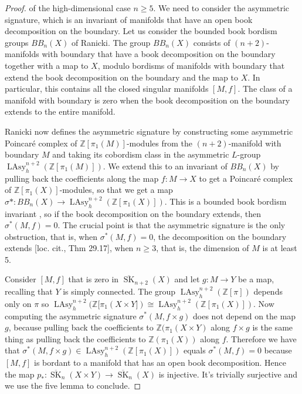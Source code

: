 \documentclass{amsart}
\theoremstyle{definition}
\theoremstyle{remark}
\newcommand{\Z}{\mathbb{Z}}
\newcommand{\SK}{\operatorname{SK}}
\newcommand{\bSK}{\overline{\SK}}
\begin{document}
\begin{proof}
    of the high-dimensional case $n\geq 5$. We need to consider the asymmetric signature, which is an invariant of manifolds that have an open book decomposition on the boundary. Let us consider the bounded book bordism groups $BB_n(X)$ of Ranicki. The group $BB_n(X)$ consists of $(n+2)$-manifolds with boundary that have a book decomposition on the boundary together with a map to $X$, modulo bordisms of manifolds with boundary that extend the book decomposition on the boundary and the map to $X$. In particular, this contains all the closed singular manifolds $[M,f]$. The class of a manifold with boundary is zero when the book decomposition on the boundary extends to the entire manifold. 

    Ranicki now defines the asymmetric signature by constructing some asymmetric Poincar\'e complex of $\Z[\pi_1(M)]$-modules from the $(n+2)$-manifold with boundary $M$ and taking its cobordism class in the asymmetric $L$-group $\operatorname{LAsy}_h^{n+2}(\Z[\pi_1(M)])$. We extend this to an invariant of $BB_n(X)$ by pulling back the coefficients along the map $f:M\to X$ to get a Poincar\'e complex of $\Z[\pi_1(X)]$-modules, so that we get a map $\sigma*: BB_n(X) \to \operatorname{LAsy}_h^{n+2}(\Z[\pi_1(X)])$. This is a bounded book bordism invariant \cite[Prop 29.16]{ranicki2013high}, so if the book decomposition on the boundary extends, then $\sigma^*(M,f) = 0$. The crucial point is that the asymmetric signature is the only obstruction, that is, when $\sigma^*(M,f) = 0$, the decomposition on the boundary extends [loc. cit., Thm 29.17], when $n\geq 3$, that is, the dimension of $M$ is at least 5.

    Consider $[M,f]$ that is zero in $\bSK_{n+2}(X)$ and let $g:M\to Y$ be a map, recalling that $Y$ is simply connected. The group $\operatorname{LAsy}_h^{n+2}(\Z[\pi])$ depends only on $\pi$ so $\operatorname{LAsy}_h^{n+2}(\Z[\pi_1(X\times Y])\cong \operatorname{LAsy}_h^{n+2}(\Z[\pi_1(X)])$. Now computing the asymmetric signature $\sigma^*(M,f\times g)$ does not depend on the map $g$, because pulling back the coefficients to $\Z(\pi_1(X\times Y)$ along $f\times g$ is the same thing as pulling back the coefficients to $\Z(\pi_1(X))$ along $f$. Therefore we have that $\sigma^*(M,f\times g)\in \operatorname{LAsy}_h^{n+2}(\Z[\pi_1(X)])$ equals $\sigma^*(M,f) = 0$ because $[M,f]$ is bordant to a manifold that has an open book decomposition. Hence the map $p_*:\bSK_n(X\times Y)\to\bSK_n(X)$ is injective. It's trivially surjective and we use the five lemma to conclude.
\end{proof} 
\end{document}
